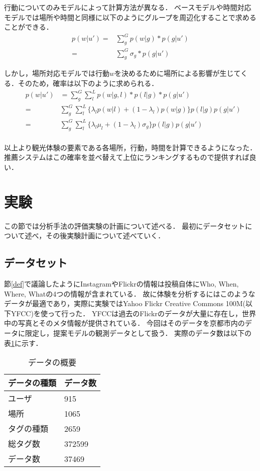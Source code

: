 \documentclass[a4j,10pt, twocolumn]{jarticle}
\begin{document}
行動についてのみモデルによって計算方法が異なる．
ベースモデルや時間対応モデルでは場所や時間と同様に以下のようにグループを周辺化することで求めることができる．
\begin{eqnarray}
  p(w|u') =& \sum_g^G p(w|g) * p(g|u') \nonumber \\
  =& \sum_g^G \sigma_g * p(g|u')
\end{eqnarray}

しかし，場所対応モデルでは行動$w$を決めるために場所による影響が生じてくる．そのため，確率は以下のように求められる．
\begin{eqnarray*}
  &p(w|u')& = \sum_g^G \sum_l^L p(w|g, l) * p(l|g) * p(g|u') \\
  &=& \sum_g^G \sum_l^L \{ \lambda_l p(w|l) + (1-\lambda_l) p(w|g) \} p(l|g) p(g|u') \\
  &=& \sum_g^G \sum_l^L \{ \lambda_l \mu_l + (1-\lambda_l) \sigma_g \} p(l|g) p(g|u') \\
\end{eqnarray*}

以上より観光体験の要素である各場所，行動，時間を計算できるようになった．推薦システムはこの確率を並べ替えて上位にランキングするもので提供すれば良い．

\section{実験} \label{experiment}
この節では分析手法の評価実験の計画について述べる．
最初にデータセットについて述べ，その後実験計画について述べていく．

\subsection{データセット} \label{dataset}
節\ref{def}で議論したようにInstagramやFlickrの情報は投稿自体にWho, When, Where, Whatの4つの情報が含まれている．
故に体験を分析するにはこのようなデータが最適であり，実際に実験ではYahoo Flickr Creative Commons 100M(以下YFCC)\cite{thomee2016yfcc100m}を使って行った．
YFCCは過去のFlickrのデータが大量に存在し，世界中の写真とそのメタ情報が提供されている．
今回はそのデータを京都市内のデータに限定し，提案モデルの観測データとして扱う．
実際のデータ数は以下の表\ref{dataset-table}に示す．

\begin{table}[tb]
  \begin{center}
    \caption{データの概要}
    \label{dataset-table}
    \begin{tabular}{ p{5cm} p{1.5cm} } \hline \hline
      データの種類 & データ数 \\  \hline
      ユーザ & 915 \\
      場所 & 1065 \\
      タグの種類 & 2659 \\
      総タグ数 & 372599 \\ \hline
      データ数 & 37469 \\ \hline \hline
    \end{tabular}
  \end{center}
\end{table}
\end{document}
